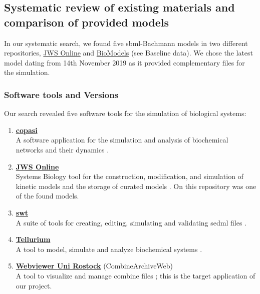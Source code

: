 \subsection*{Systematic review of existing materials and comparison of provided models}
In our systematic search, we found five \ac{sbml}-Bachmann models in two different repositories, \hyperlink{https://www.systemsmedicine.net/posts/jws-online-biological-systems-modelling}{JWS Online} and \hyperlink{https://www.ebi.ac.uk/biomodels/}{BioModels} (see Baseline data). We chose the latest model dating from 14th November 2019 as it provided complementary files for the simulation.

\subsubsection*{Software tools and Versions}
Our search revealed five software tools for the simulation of biological systems:
\begin{enumerate} 
    \item \hyperlink{http://copasi.org/}{\textbf{\ac{copasi}}}\\A software application for the simulation and analysis of biochemical networks and their dynamics \cite{copasi}.
   
    \item \hyperlink{https://www.systemsmedicine.net/posts/jws-online-biological-systems-modelling}{\textbf{JWS Online}}\\ Systems Biology tool for the construction, modification, and simulation of kinetic models and the storage of curated models \cite{jwsonline}. On this repository was one of the found models.
   
    \item \hyperlink{https://sed-ml.org/}{\textbf{\ac{swt}}}\\A suite of tools for creating, editing, simulating and validating \ac{sedml} files \cite{sedml}. 
   
    \item \hyperlink{https://tellurium.readthedocs.io/en/latest/}{\textbf{Tellurium}}\\ A tool to model, simulate and analyze biochemical systems \cite{tellurium}.
    
     \item \hyperlink{https://cat.bio.informatik.uni-rostock.de/}{\textbf{Webviewer Uni Rostock}} (CombineArchiveWeb)\\ A tool to visualize and manage \ac{combine} files \cite{combine}; this is the target application of our project. 
\end{enumerate}

